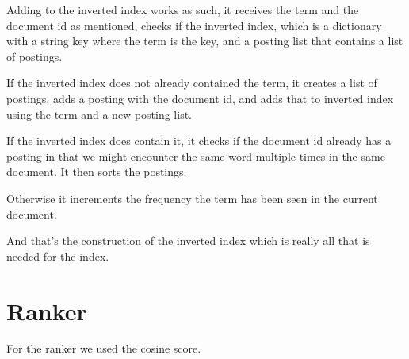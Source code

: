 	Adding to the inverted index works as such, it receives the term and the document id as mentioned, checks if the inverted index, which is a dictionary with a string key where the term is the key, and a posting list that contains a list of postings.
	
	If the inverted index does not already contained the term, it creates a list of postings, adds a posting with the document id, and adds that to inverted index using the term and a new posting list.
	
	If the inverted index does contain it, it checks if the document id already has a posting in that we might encounter the same word multiple times in the same document. It then sorts the postings.
	
	Otherwise it increments the frequency the term has been seen in the current document.
	
	And that's the construction of the inverted index which is really all that is needed for the index.
	
	\section{Ranker}
	For the ranker we used the cosine score.
		
	


